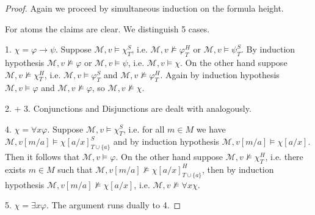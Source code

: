 \documentclass[a4paper,UKenglish,cleveref, autoref, thm-restate]{lipics-v2021}
\begin{document}
\begin{proof}
	Again we proceed by simultaneous induction on the formula height.
	
	For atoms the claims are clear. We distinguish 5 cases.
	
	1. $\chi = \varphi\to\psi$. Suppose $\mathcal M, v\models\chi^S_T$, i.e. $\mathcal M, v\not\models\varphi^H_T$ or $\mathcal M, v\models\psi^S_T$. By induction hypothesis $\mathcal M, v\not\models \varphi$ or $\mathcal M, v\models\psi$, i.e. $\mathcal M, v\models \chi$. On the other hand suppose $\mathcal M, v\not\models\chi^H_T$, i.e. $\mathcal M, v\models\varphi^S_T$ and $\mathcal M, v\not\models\varphi^H_T$. Again by induction hypothesis $\mathcal M,v\models\varphi$ and $\mathcal M, v\not\models \varphi$, so $\mathcal M, v\not\models\chi$.
	
	2. + 3. Conjunctions and Disjunctions are dealt with analogously.
	
	4. $\chi = \forall x\varphi$.  Suppose $\mathcal M, v\models\chi^S_T$, i.e. for all $m\in M$ we have $\mathcal M, v[m/a]\models \chi[a/x]^S_{T\cup\{a\}}$ and by induction hypothesis $\mathcal M, v[m/a]\models \chi[a/x]$. Then it follows that $\mathcal M, v\models\varphi$. On the other hand suppose $\mathcal M, v\not\models\chi^H_T$, i.e. there exists $m\in M$ such that $\mathcal M, v[m/a]\not\models\chi[a/x]^H_{T\cup \{a\}}$, then by induction hypothesis $\mathcal M, v[m/a]\not\models \chi[a/x]$, i.e. $\mathcal M, v\not\models\forall x\chi$.
	
	5. $\chi = \exists x\varphi$.  The argument runs dually to 4.
\end{proof}
\end{document}
